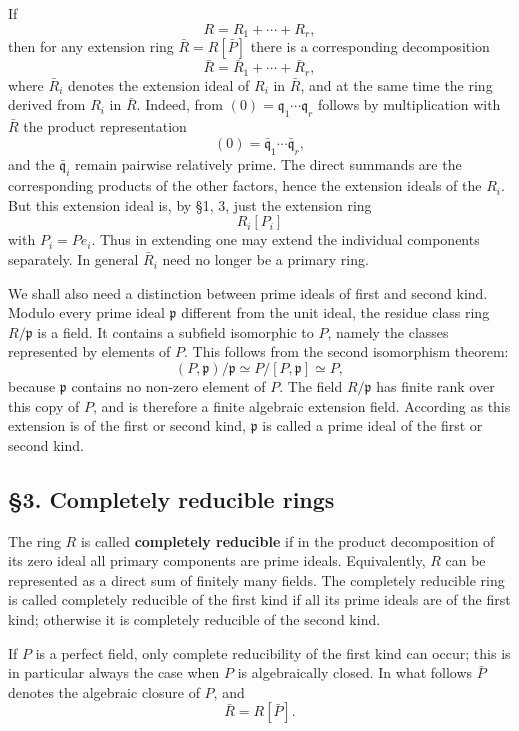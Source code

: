 \documentclass[11pt]{article}
\begin{document}
If \[
  R=R_1+
\cdots+R_r,
\] then for any extension ring \(\bar R=R[\bar P]\) there is a
corresponding decomposition \[
  \bar R=\bar R_1+
\cdots+\bar R_r,
\] where \(\bar R_i\) denotes the extension ideal of \(R_i\) in
\(\bar R\), and at the same time the ring derived from \(R_i\) in
\(\bar R\). Indeed, from \((0)=\mathfrak q_1\cdots\mathfrak q_r\)
follows by multiplication with \(\bar R\) the product representation \[
  (0)=\bar{\mathfrak q}_1\cdots\bar{\mathfrak q}_r,
\] and the \(\bar{\mathfrak q}_i\) remain pairwise relatively prime. The
direct summands are the corresponding products of the other factors,
hence the extension ideals of the \(R_i\). But this extension ideal is,
by §1, 3, just the extension ring \[
  R_i[P_i]
\] with \(P_i=Pe_i\). Thus in extending one may extend the individual
components separately. In general \(\bar R_i\) need no longer be a
primary ring.

We shall also need a distinction between prime ideals of first and
second kind. Modulo every prime ideal \(\mathfrak p\) different from the
unit ideal, the residue class ring \(R/\mathfrak p\) is a field. It
contains a subfield isomorphic to \(P\), namely the classes represented
by elements of \(P\). This follows from the second isomorphism theorem:
\[
  (P,\mathfrak p)/\mathfrak p \simeq P/[P,\mathfrak p]\simeq P,
\] because \(\mathfrak p\) contains no non-zero element of \(P\). The
field \(R/\mathfrak p\) has finite rank over this copy of \(P\), and is
therefore a finite algebraic extension field. According as this
extension is of the first or second kind, \(\mathfrak p\) is called a
prime ideal of the first or second kind.

\subsection{§3. Completely reducible
rings}\label{completely-reducible-rings}

The ring \(R\) is called \textbf{completely reducible} if in the product
decomposition of its zero ideal all primary components are prime ideals.
Equivalently, \(R\) can be represented as a direct sum of finitely many
fields. The completely reducible ring is called completely reducible of
the first kind if all its prime ideals are of the first kind; otherwise
it is completely reducible of the second kind.

If \(P\) is a perfect field, only complete reducibility of the first
kind can occur; this is in particular always the case when \(P\) is
algebraically closed. In what follows \(\bar P\) denotes the algebraic
closure of \(P\), and \[
  \bar R=R[\bar P].
\]
\end{document}
